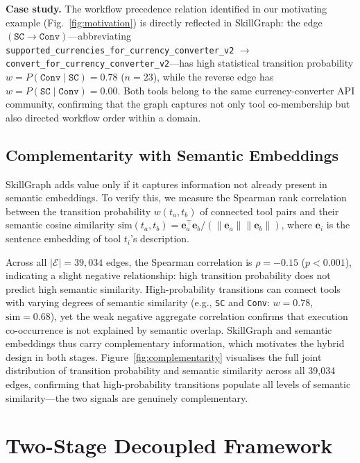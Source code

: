 \documentclass[lettersize,journal]{IEEEtran}
\begin{document}
\textbf{Case study.}
The workflow precedence relation identified in our motivating example (Fig.~\ref{fig:motivation}) is directly reflected in SkillGraph: the edge $(\texttt{SC} \to \texttt{Conv})$---abbreviating \texttt{supported\_currencies\_for\_currency\_converter\_v2} $\to$ \texttt{convert\_for\_currency\_converter\_v2}---has high statistical transition probability $w = P(\texttt{Conv}\mid\texttt{SC}) = 0.78$ ($n=23$), while the reverse edge has $w = P(\texttt{SC}\mid\texttt{Conv}) = 0.00$.
Both tools belong to the same currency-converter API community, confirming that the graph captures not only tool co-membership but also directed workflow order within a domain.

\subsection{Complementarity with Semantic Embeddings}

SkillGraph adds value only if it captures information not already present in semantic embeddings.
To verify this, we measure the Spearman rank correlation between the transition probability $w(t_a, t_b)$ of connected tool pairs and their semantic cosine similarity $\text{sim}(t_a, t_b) = \mathbf{e}_a^\top \mathbf{e}_b / (\|\mathbf{e}_a\|\|\mathbf{e}_b\|)$, where $\mathbf{e}_i$ is the sentence embedding of tool $t_i$'s description.

Across all $|\mathcal{E}| = 39{,}034$ edges, the Spearman correlation is $\rho = -0.15$ ($p < 0.001$), indicating a slight negative relationship: high transition probability does not predict high semantic similarity.
High-probability transitions can connect tools with varying degrees of semantic similarity (e.g., \texttt{SC} and \texttt{Conv}: $w = 0.78$, $\text{sim} = 0.68$), yet the weak negative aggregate correlation confirms that execution co-occurrence is not explained by semantic overlap.
SkillGraph and semantic embeddings thus carry complementary information, which motivates the hybrid design in both stages.
Figure~\ref{fig:complementarity} visualises the full joint distribution of transition probability and semantic similarity across all 39,034 edges, confirming that high-probability transitions populate all levels of semantic similarity---the two signals are genuinely complementary.



\section{Two-Stage Decoupled Framework}
\label{sec:framework}
\end{document}
